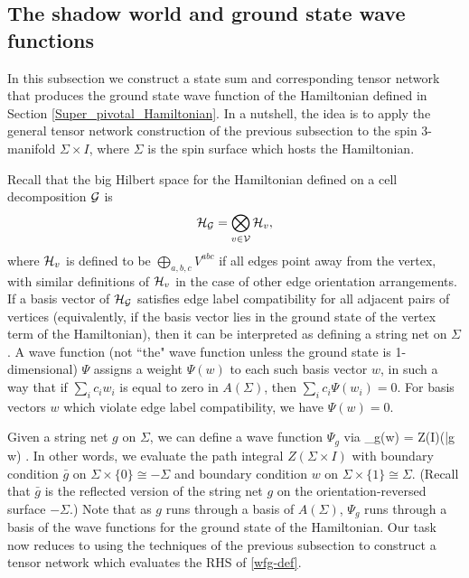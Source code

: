 \subsection{The shadow world and ground state wave functions}\label{shadowworld}

In this subsection we construct a state sum and corresponding tensor network that produces the ground state wave function of the 
Hamiltonian defined in Section \ref{Super_pivotal_Hamiltonian}.
In a nutshell, the idea is to apply the general tensor network construction of the previous subsection to the spin 3-manifold
$\Sigma\times I$, where $\Sigma$ is the spin surface which hosts the Hamiltonian.

Recall that the big Hilbert space for the Hamiltonian defined on a cell decomposition $\mathcal{G}$ is
\begin{align} \label{bhs_redef}
	\mathcal{H}_{\mathcal{G}} =\bigotimes_{v \in \mathcal{V}} \mathcal{H}_v,
\end{align}
where $\mathcal{H}_v $ is defined to be $\bigoplus_{a,b,c} V^{abc}$ if all edges point away from the vertex, 
with similar definitions of $\mathcal{H}_v$ in the case of other edge orientation arrangements.
If a basis vector of $\mathcal{H}_{\mathcal{G}}$ satisfies edge label compatibility for all adjacent pairs of vertices
(equivalently, if the basis vector lies in the ground state of the vertex term of the Hamiltonian),
then it can be interpreted as defining a string net on $\Sigma$.
A wave function (not ``the" wave function unless the ground state is 1-dimensional) $\Psi$ assigns a weight $\Psi(w)$ to each such basis vector $w$, 
in such a way that if $\sum_i c_i w_i$ is equal to zero in $A(\Sigma)$, then $\sum_i c_i \Psi(w_i) = 0$.
For basis vectors $w$ which violate edge label compatibility, we have $\Psi(w) = 0$.

Given a string net $g$ on $\Sigma$, we can define a wave function $\Psi_g$ via
\be  \label{wfg-def}
	\Psi_g(w) = Z(\Sigma\times I)(\bar g \cup w) .
\ee
In other words, we evaluate the path integral $Z(\Sigma\times I)$ with boundary condition $\bar g$ on $\Sigma\times\{0\} \cong -\Sigma$
and boundary condition $w$ on $\Sigma\times\{1\} \cong \Sigma$.
(Recall that $\bar g$ is the reflected version of the string net $g$ on the orientation-reversed surface $-\Sigma$.)
Note that as $g$ runs through a basis of $A(\Sigma)$, $\Psi_g$ runs through a basis of the wave functions for the ground state of the Hamiltonian.
Our task now reduces to using the techniques of the previous subsection to construct a tensor network which evaluates the RHS of \eqref{wfg-def}.

